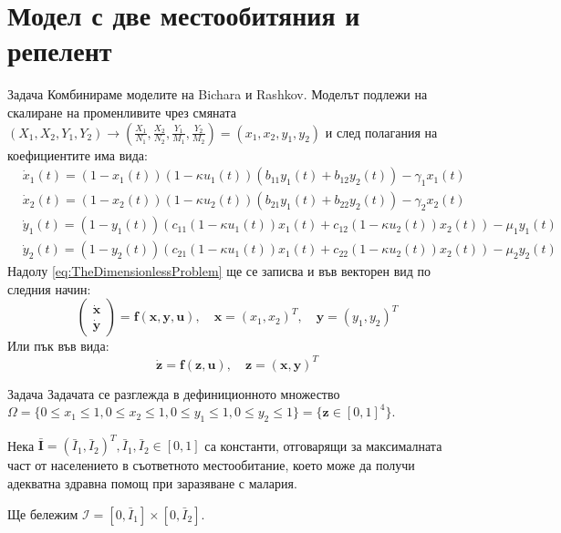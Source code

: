 \section{\hspace{1em}Модел с две местообитяния и репелент}
\begin{frame}[t]{Задача}
  Комбинираме моделите на Bichara и Rashkov.
  Моделът подлежи на скалиране на променливите чрез смяната $(X_1, X_2, Y_1, Y_2) \rightarrow (\frac{X_1}{N_1}, \frac{X_2}{N_2}, \frac{Y_1}{M_1}, \frac{Y_2}{M_2}) = (x_1, x_2, y_1, y_2)$ и след полагания на коефициентите има вида:
  \begin{equation}
    \label{eq:TheDimensionlessProblem}
    \begin{split}
      &\dot{x}_1(t) = (1-x_1(t)) (1-\kappa u_1(t)) \left(b_{11} y_1(t) + b_{12} y_2(t)\right) - \gamma_1 x_1(t) \\
      &\dot{x}_2(t) = (1-x_2(t)) (1-\kappa u_2(t))\left(b_{21} y_1(t) + b_{22} y_2(t)\right) - \gamma_2 x_2(t) \\
      &\dot{y}_1(t) = (1-y_1(t)) \left(c_{11}(1-\kappa u_1(t)) x_1(t) + c_{12}(1-\kappa u_2(t)) x_2(t)\right) - \mu_1 y_1(t) \\
      &\dot{y}_2(t) = (1-y_2(t)) \left(c_{21}(1-\kappa u_1(t)) x_1(t) + c_{22} (1-\kappa u_2(t)) x_2(t)\right) - \mu_2 y_2(t)
    \end{split}
  \end{equation}
  Надолу \eqref{eq:TheDimensionlessProblem} ще се записва и във векторен вид по следния начин:
  \begin{equation}
    \begin{pmatrix}
      \dot{\boldsymbol{x}} \\
      \dot{\boldsymbol{y}}
    \end{pmatrix}
    =
    \boldsymbol{f}(\boldsymbol{x}, \boldsymbol{y}, \boldsymbol{u}), \quad
    \boldsymbol{x} = (x_1, x_2)^T, \quad \boldsymbol{y} = (y_1, y_2)^T
  \end{equation}
  Или пък във вида:
  \begin{equation}
    \dot{\boldsymbol{z}} = \boldsymbol{f}(\boldsymbol{z}, \boldsymbol{u}), \quad \boldsymbol{z} = (\boldsymbol{x}, \boldsymbol{y})^T
  \end{equation}
\end{frame}

\begin{frame}{Задача}
  Задачата се разглежда в дефиниционното множество $\Omega = \{0 \leq x_1 \leq 1, 0 \leq x_2 \leq 1, 0 \leq y_1 \leq 1, 0 \leq y_2 \leq 1\} = \{\boldsymbol{z} \in [0, 1]^4\}$.

  Нека $\bar{\boldsymbol{I}} = (\bar{I}_1, \bar{I}_2)^T, \bar{I}_1, \bar{I}_2 \in [0, 1]$ са константи, отговарящи за максималната част от населението в съответното местообитание, което може да получи адекватна здравна помощ при заразяване с малария.

  Ще бележим $\mathscr{I} = [0, \bar{I}_1] \times [0, \bar{I}_2]$.
\end{frame}

